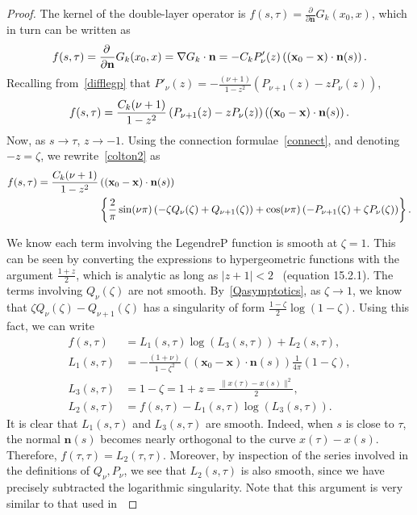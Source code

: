 \begin{proof}
The kernel of the double-layer operator is $f(s,\tau)=
\frac{\partial}{\partial \mathbf{n}} G_{k}({x}_{0},{x})$, which in turn
can be written as 
\begin{align*}
  f(s,\tau)=\frac{\partial \, }{\partial \mathbf{n}} G_{k}(x_{0},x) 
  =\nabla G_{k} \cdot \mathbf{n}
  =-C_k P'_{\nu}(z)\left(
    (\mathbf{x}_{0}-\mathbf{x})\cdot \mathbf{n}(s) \right).
\end{align*}
Recalling from~\eqref{difflegp} that
$P'_{\nu}(z)=-\frac{(\nu+1)}{1-z^{2}}(P_{\nu+1}(z)-z P_{\nu}(z))$,
\begin{align}
  f(s,\tau)= \frac{C_k(\nu+1)}{1-z^2} \left(
    P_{\nu+1}(z)-zP_{\nu}(z)\right)\left(
  (\mathbf{x}_0-\mathbf{x})\cdot \mathbf{n}(s) \right).
  \label{colton2}
\end{align}
Now, as $s \rightarrow \tau$, $z \rightarrow -1.$ Using the connection
formulae~\eqref{connect}, and denoting $-z = \zeta$, we
rewrite~\eqref{colton2} as
\begin{align}
 f(s,\tau)= \frac{C_k(\nu+1)}{1-z^2}&\left(
   (\mathbf{x}_0-\mathbf{x})\cdot \mathbf{n}(s) \right) \nonumber \\
    &\left\{ \frac{2}{\pi}\sin(\nu\pi)
    \left( -\zeta Q_{\nu}(\zeta) + Q_{\nu+1}(\zeta)\right) 
    +\cos(\nu\pi)\left(
    -P_{\nu+1}(\zeta)+\zeta P_\nu(\zeta)\right)\right\}.
\end{align}

We know each term involving the LegendreP function is smooth at
$\zeta=1$.  This can be seen by converting the expressions to
hypergeometric functions with the argument $\frac{1+z}{2}$, which is
analytic as long as $|z+1| < 2$~\cite{fatAbramowitz} (equation 15.2.1).
The terms involving $Q_{\nu}(\zeta)$ are not smooth.
By~\eqref{Qasymptotics}, as $\zeta \rightarrow 1$, we know that $\zeta
Q_\nu(\zeta) - Q_{\nu+1}(\zeta)$ has a singularity of form
$\frac{1-\zeta}{2}\log(1-\zeta)$.  Using this fact, we can write
\begin{align*}
 f(s,\tau)&= L_{1}(s,\tau)\log(L_3(s,\tau)) + L_2(s,\tau), \\
 L_1(s,\tau) &= - \frac{(1+\nu)}{1-\zeta^2}\left(
    (\mathbf{x}_{0}-\mathbf{x})\cdot \mathbf{n}(s) \right) 
    \frac{1}{4\pi}(1-\zeta), \\ 
 L_{3}(s,\tau)&= 1-\zeta = 1+ z = \frac{\|x(\tau) - x(s)\|^2}{2}, \\
 L_{2}(s,\tau)&= f(s,\tau) - L_{1}(s,\tau)\log(L_{3}(s,\tau)).
\end{align*}
It is clear that $L_{1}(s,\tau)$ and $L_{3}(s,\tau)$ are smooth.
Indeed, when $s$ is close to $\tau$, the normal $\mathbf{n}(s)$ becomes
nearly orthogonal to the curve $x(\tau)-x(s)$. Therefore, $f(\tau,\tau)
= L_{2}(\tau,\tau).$  Moreover, by inspection of the series involved in
the definitions of $Q_{\nu},P_{\nu}$, we see that $L_{2}(s,\tau)$ is
also smooth, since we have precisely subtracted the logarithmic
singularity. Note that this argument is very similar to that used
in~\cite{coltonkress}


\end{proof}
